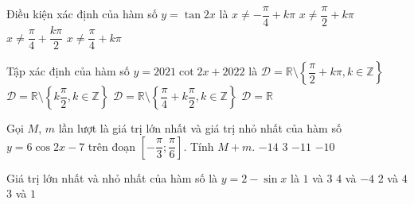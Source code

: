 \begin{ex}%
	Điều kiện xác  định của hàm số $y=\tan 2x$ là
	\choice 
		{$x\neq -\dfrac{\pi  }{4}+k\pi $}
		{$x\neq \dfrac{\pi  }{2}+k\pi $}
		{\True $x\neq \dfrac{\pi }{4}+\dfrac{k\pi  }{2}$}
		 {$x\neq \dfrac{\pi }{4}+k\pi $}
\end{ex}

\begin{ex}%
	Tập xác định của hàm số $y=2021\cot  2x+2022$ là
	\choice 
		{$\mathscr{D}=\mathbb{R}\setminus \left\{ \dfrac{\pi }{2}+k\pi,k\in  \mathbb{Z} \right\} $}
		{\True $\mathscr{D}=\mathbb{R}\setminus \left\{ k\dfrac{\pi }{2},k\in \mathbb{Z}  \right\}$}
		{$\mathscr{D}=\mathbb{R}\setminus \left\{ \dfrac{\pi  }{4}+k\dfrac{\pi }{2},k\in \mathbb{Z} \right\}$}
		 {$\mathscr{D}=\mathbb{R}$}
\end{ex}

\begin{ex}%
	Gọi  $M$, $m$ lần lượt là giá trị lớn nhất và giá trị nhỏ nhất của hàm số $y=6 \cos 2x-7$ trên đoạn $\left[-\dfrac{\pi}{3};\dfrac{\pi}{6}\right]$. Tính $M+m$.
	 \choice
		 {$-14$}
		{$3$} 
		{\True $-11$} 
		{$-10$} 
\end{ex}

\begin{ex}%
	Giá trị lớn nhất và  nhỏ nhất của hàm số là $y=2-\sin x$ là
	 \choice
		{\True $1$  và $3$}
		{$4$ và  $-4$}
		 {$2$ và $4$}
		{$3$ và  $1$}
\end{ex}

